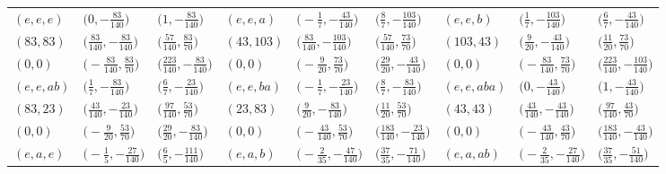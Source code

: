 \documentclass[10pt,a4paper]{amsart}
\theoremstyle{definition}
\numberwithin{equation}{section}
\begin{document}
\begin{landscape}
\begin{table}[th]\centering\small
 \begin{tabular}{|lll|lll|lll|}
 \hline
$(e, e, e)$ & $\bigl(0, -\frac{83}{140}\bigr)$ & $\bigl(1, -\frac{83}{140}\bigr)$ & $(e, e, a)$ & $\bigl(-\frac{1}{7}, -\frac{43}{140}\bigr)$ & $\bigl(\frac{8}{7}, -\frac{103}{140}\bigr)$ & $(e, e, b)$ & $\bigl(\frac{1}{7}, -\frac{103}{140}\bigr)$ & $\bigl(\frac{6}{7}, -\frac{43}{140}\bigr)$
\\
$(83, 83)$ & $\bigl(\frac{83}{140}, -\frac{83}{140}\bigr)$ & $\bigl(\frac{57}{140}, \frac{83}{70}\bigr)$ & $(43, 103)$ & $\bigl(\frac{83}{140}, -\frac{103}{140}\bigr)$ & $\bigl(\frac{57}{140}, \frac{73}{70}\bigr)$ & $(103, 43)$ & $\bigl(\frac{9}{20}, -\frac{43}{140}\bigr)$ & $\bigl(\frac{11}{20}, \frac{73}{70}\bigr)$
\\
$(0, 0)$ & $\bigl(-\frac{83}{140}, \frac{83}{70}\bigr)$ & $\bigl(\frac{223}{140}, -\frac{83}{140}\bigr)$ & $(0, 0)$ & $\bigl(-\frac{9}{20}, \frac{73}{70}\bigr)$ & $\bigl(\frac{29}{20}, -\frac{43}{140}\bigr)$ & $(0, 0)$ & $\bigl(-\frac{83}{140}, \frac{73}{70}\bigr)$ & $\bigl(\frac{223}{140}, -\frac{103}{140}\bigr)$ \\\hline
$(e, e, ab)$ & $\bigl(\frac{1}{7}, -\frac{83}{140}\bigr)$ & $\bigl(\frac{6}{7}, -\frac{23}{140}\bigr)$ & $(e, e, ba)$ & $\bigl(-\frac{1}{7}, -\frac{23}{140}\bigr)$ & $\bigl(\frac{8}{7}, -\frac{83}{140}\bigr)$ & $(e, e, aba)$ & $\bigl(0, -\frac{43}{140}\bigr)$ & $\bigl(1, -\frac{43}{140}\bigr)$
\\
$(83, 23)$ & $\bigl(\frac{43}{140}, -\frac{23}{140}\bigr)$ & $\bigl(\frac{97}{140}, \frac{53}{70}\bigr)$ & $(23, 83)$ & $\bigl(\frac{9}{20}, -\frac{83}{140}\bigr)$ & $\bigl(\frac{11}{20}, \frac{53}{70}\bigr)$ & $(43, 43)$ & $\bigl(\frac{43}{140}, -\frac{43}{140}\bigr)$ & $\bigl(\frac{97}{140}, \frac{43}{70}\bigr)$
\\
$(0, 0)$ & $\bigl(-\frac{9}{20}, \frac{53}{70}\bigr)$ & $\bigl(\frac{29}{20}, -\frac{83}{140}\bigr)$ & $(0, 0)$ & $\bigl(-\frac{43}{140}, \frac{53}{70}\bigr)$ & $\bigl(\frac{183}{140}, -\frac{23}{140}\bigr)$ & $(0, 0)$ & $\bigl(-\frac{43}{140}, \frac{43}{70}\bigr)$ & $\bigl(\frac{183}{140}, -\frac{43}{140}\bigr)$ \\\hline
$(e, a, e)$ & $\bigl(-\frac{1}{5}, -\frac{27}{140}\bigr)$ & $\bigl(\frac{6}{5}, -\frac{111}{140}\bigr)$ & $(e, a, b)$ & $\bigl(-\frac{2}{35}, -\frac{47}{140}\bigr)$ & $\bigl(\frac{37}{35}, -\frac{71}{140}\bigr)$ & $(e, a, ab)$ & $\bigl(-\frac{2}{35}, -\frac{27}{140}\bigr)$ & $\bigl(\frac{37}{35}, -\frac{51}{140}\bigr)$

\end{tabular}
\end{table}
\end{landscape}
\end{document}
